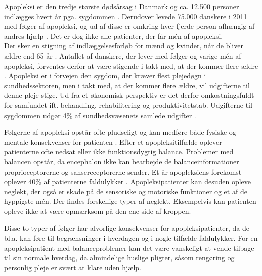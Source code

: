 Apopleksi er den tredje største dødsårsag i Danmark og ca. 12.500 personer indlægges hvert år pga. sygdommen \cite{Hjernesagen2015a}. %
Derudover levede 75.000 danskere i 2011 med følger af apopleksi, og ud af disse er omkring hver fjerde person afhængig af andres hjælp \cite{Hjernesagen2015a}. Det er dog ikke alle patienter, der får mén af apopleksi. \\
Der sker en stigning af indlæggelsesforløb for mænd og kvinder, når de bliver ældre end 65 år \cite{Sundhedsstyrelsen2011}. Antallet af danskere, der lever med følger og varige mén af apopleksi, forventes derfor at være stigende i takt med, at der kommer flere ældre \cite{Sagen2014}. Apopleksi er i forvejen den sygdom, der kræver flest plejedøgn i sundhedssektoren, men i takt med, at der kommer flere ældre, vil udgifterne til denne pleje stige. Ud fra et økonomisk perspektiv er det derfor omkostningsfuldt for samfundet ift. behandling, rehabilitering og produktivitetstab.  Udgifterne til sygdommen udgør 4\% af sundhedsvæsenets samlede udgifter \cite{Hjernesagen2015a, Kruuse2014}.
 
Følgerne af apopleksi opstår ofte pludseligt og kan medføre både fysiske og mentale konsekvenser for patienten \cite{Muus2008}. Efter et apopleksitilfælde oplever  patienterne ofte nedsat eller ikke funktionsdygtig balance. Problemer med balancen opstår, da encephalon ikke kan bearbejde de balanceinformationer proprioceptorerne og sansereceptorerne sender. \cite{Karnath2003} Et år apopleksiens forekomst oplever 40\% af patienterne faldulykker \cite{Association2006}. 
Apopleksipatienter kan desuden opleve neglekt, der også er skade på de sensoriske og motoriske funktioner og et af de hyppigste mén. Der findes forskellige typer af neglekt. Eksempelvis kan patienten opleve ikke at være opmærksom på den ene side af kroppen. \cite{Sundhed.dk} 

Disse to typer af følger har alvorlige konsekvenser for apopleksipatienter, da de bl.a. kan føre til begrænsninger i hverdagen og i nogle tilfælde faldulykker. \cite{Muus2008,Nichols1997} For en apopleksipatient med balanceproblemer kan det være vanskeligt at vende tilbage til sin normale hverdag, da almindelige huslige pligter, såsom rengøring og personlig pleje er svært at klare uden hjælp. \cite{Sundhedsstyrelsen2010}

